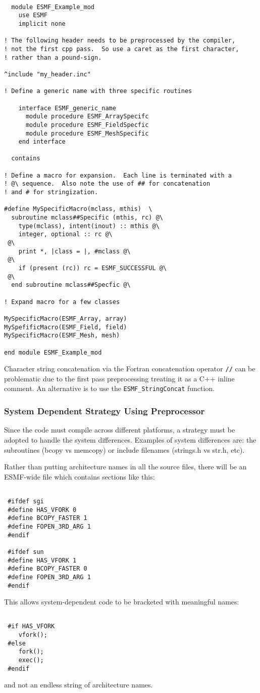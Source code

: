 \begin{verbatim}

  module ESMF_Example_mod
    use ESMF
    implicit none

! The following header needs to be preprocessed by the compiler,
! not the first cpp pass.  So use a caret as the first character,
! rather than a pound-sign.

^include "my_header.inc"

! Define a generic name with three specific routines

    interface ESMF_generic_name
      module procedure ESMF_ArraySpecifc
      module procedure ESMF_FieldSpecfic
      module procedure ESMF_MeshSpecific
    end interface

  contains

! Define a macro for expansion.  Each line is terminated with a
! @\ sequence.  Also note the use of ## for concatenation
! and # for stringization.

#define MySpecificMacro(mclass, mthis)  \
  subroutine mclass##Specific (mthis, rc) @\
    type(mclass), intent(inout) :: mthis @\
    integer, optional :: rc @\
 @\
    print *, |class = |, #mclass @\
 @\
    if (present (rc)) rc = ESMF_SUCCESSFUL @\
 @\
  end subroutine mclass##Specfic @\

! Expand macro for a few classes

MySpecificMacro(ESMF_Array, array)
MySpefificMacro(ESMF_Field, field)
MySpecificMacro(ESMF_Mesh, mesh)

end module ESMF_Example_mod

\end{verbatim}

Character string concatenation via the Fortran concatenation operator {\tt //}
can be problematic due to the first pass preprocessing treating it as a C++ inline
comment.  An alternative is to use the {\tt ESMF\_StringConcat} function.

\subsubsection{System Dependent Strategy Using Preprocessor} Since the code
must compile across different platforms, a strategy must be adopted to
handle the system differences. Examples of system differences are: the
subroutines (bcopy vs memcopy) or include filenames (strings.h vs str.h,
etc).

Rather than putting architecture names in all the source files, there will
be an ESMF-wide file which contains sections like this: 
\begin{verbatim}

 #ifdef sgi 
 #define HAS_VFORK 0 
 #define BCOPY_FASTER 1 
 #define FOPEN_3RD_ARG 1 
 #endif

 #ifdef sun 
 #define HAS_VFORK 1 
 #define BCOPY_FASTER 0 
 #define FOPEN_3RD_ARG 1 
 #endif

\end{verbatim} This allows system-dependent code to be bracketed with
meaningful names: 

\begin{verbatim} 

 #if HAS_VFORK
    vfork();
 #else
    fork(); 
    exec();
 #endif

\end{verbatim} 
and not an endless string of architecture names.

